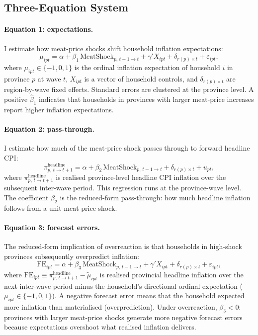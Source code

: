 \subsection{Three-Equation System}
\label{sec:three_equations}

\paragraph{Equation 1: expectations.}
I estimate how meat-price shocks shift household inflation
expectations:
\begin{equation}\label{eq:eq1}
  \mu_{ipt}
  = \alpha
  + \beta_1\,\mathrm{MeatShock}_{p,\,t-1\to t}
  + \gamma' X_{ipt}
  + \delta_{r(p)\times t}
  + \varepsilon_{ipt},
\end{equation}
where $\mu_{ipt} \in \{-1,0,1\}$ is the ordinal inflation
expectation of household $i$ in province $p$ at wave $t$,
$X_{ipt}$ is a vector of household controls, and
$\delta_{r(p)\times t}$ are region-by-wave fixed effects.
Standard errors are clustered at the province level.
A positive $\hat{\beta}_1$ indicates that households in provinces
with larger meat-price increases report higher inflation expectations.

\paragraph{Equation 2: pass-through.}
I estimate how much of the meat-price shock passes through
to forward headline CPI:
\begin{equation}\label{eq:eq2}
  \pi^{\mathrm{headline}}_{p,\,t\to t+1}
  = \alpha
  + \beta_2\,\mathrm{MeatShock}_{p,\,t-1\to t}
  + \delta_{r(p)\times t}
  + u_{pt},
\end{equation}
where $\pi^{\mathrm{headline}}_{p,\,t\to t+1}$ is realised
province-level headline CPI inflation over the subsequent inter-wave
period.
This regression runs at the province-wave level.
The coefficient $\beta_2$ is the reduced-form pass-through: how much
headline inflation follows from a unit meat-price shock.

\paragraph{Equation 3: forecast errors.}
The reduced-form implication of overreaction is that households in
high-shock provinces subsequently overpredict inflation:
\begin{equation}\label{eq:eq3}
  \mathrm{FE}_{ipt}
  = \alpha
  + \beta_3\,\mathrm{MeatShock}_{p,\,t-1\to t}
  + \gamma' X_{ipt}
  + \delta_{r(p)\times t}
  + \varepsilon_{ipt},
\end{equation}
where $\mathrm{FE}_{ipt} \equiv \pi^{\mathrm{headline}}_{p,\,t\to t+1}
- \tilde{\mu}_{ipt}$ is realised provincial headline inflation over
the next inter-wave period minus the household's directional
ordinal expectation ($\mu_{ipt} \in \{-1, 0, 1\}$).
A negative forecast error means that the household expected more
inflation than materialised (overprediction).
Under overreaction, $\beta_3 < 0$: provinces with larger meat-price
shocks generate more negative forecast errors because expectations
overshoot what realised inflation delivers.

